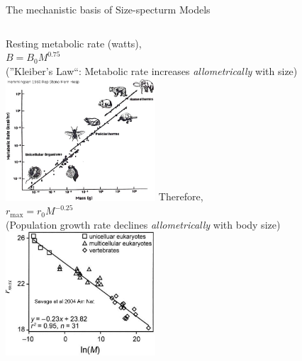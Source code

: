 \documentclass[xcolor={usenames,x11names},compress]{beamer}
\renewcommand{\(}{\begin{columns}}
\renewcommand{\)}{\end{columns}}
\newcommand{\<}[1]{\begin{column}{#1}}
\renewcommand{\>}{\end{column}}
\begin{document}
\begin{frame}{The mechanistic basis of Size-specturm Models}

  \begin{columns}[c]
    \column{2.4in}\centering
    Resting metabolic rate (watts),\\ 
    $B = B_0 M^{0.75}$\\
    {\small (''Kleiber's Law``: Metabolic rate increases {\it allometrically} with size)}\\[10pt]
    \includegraphics[width=2.2in]{MetabScaling.jpg} 
    \column{2.4in}\centering
    \pause
    Therefore,\\ 
    $r_\text{max} = r_0 M^{-0.25} $\\
    (Population growth rate declines {\it allometrically} with body size)\\[10pt]
    \includegraphics[width=2.2in]{r_max.pdf}
  \end{columns}
\pause   
\end{frame}
\end{document}
